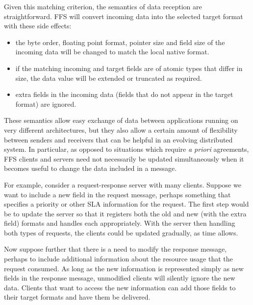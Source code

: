 Given this matching criterion, the semantics of data reception are
straightforward.  FFS will convert incoming data into the selected target
format with these side effects:
\begin{itemize}
\item the byte order, floating point format, pointer size and field size of
  the incoming data will be changed to match the local native format.
\item if the matching incoming and target fields are of atomic types that
  differ in size, the data value will be extended or truncated as
  required.
\item extra fields in the incoming data (fields that do not appear in the
  target format) are ignored.
\end{itemize}
These semantics allow easy exchange of data between applications running on
very different architectures, but they also allow a certain amount of
flexibility between senders and receivers that can be helpful in an evolving
distributed system.  In particular, as opposed to situations which require
{\it a priori} agreements, FFS clients and servers need not necessarily be
updated simultaneously when it becomes useful to change the data included in
a message.

For example, consider a request-response server with many clients.  Suppose
we want to include a new field in the request message, perhaps something
that specifies a priority or other SLA information for the request.  The
first step would be to update the server so that it registers both the old
and new (with the extra field) formats and handles each appropriately.  With
the server then handling both types of requests, the clients could be
updated gradually, as time allows.

Now suppose further that there is a need to modify the response message,
perhaps to include additional information about the resource usage that the
request consumed.  As long as the new information is represented simply as
new fields in the response message, unmodified clients will silently ignore
the new data.  Clients that want to access the new information can add those
fields to their target formats and have them be delivered.

